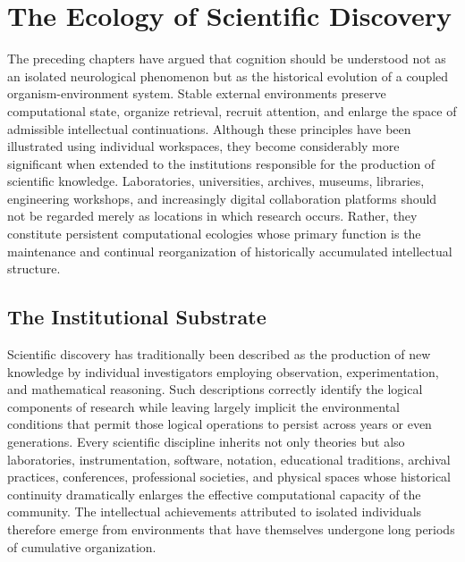 \documentclass[12pt,oneside]{article}
\theoremstyle{remark}
\begin{document}
\section{The Ecology of Scientific Discovery}

The preceding chapters have argued that cognition should be understood not as an isolated neurological phenomenon but as the historical evolution of a coupled organism-environment system. Stable external environments preserve computational state, organize retrieval, recruit attention, and enlarge the space of admissible intellectual continuations. Although these principles have been illustrated using individual workspaces, they become considerably more significant when extended to the institutions responsible for the production of scientific knowledge. Laboratories, universities, archives, museums, libraries, engineering workshops, and increasingly digital collaboration platforms should not be regarded merely as locations in which research occurs. Rather, they constitute persistent computational ecologies whose primary function is the maintenance and continual reorganization of historically accumulated intellectual structure.

\subsection{The Institutional Substrate}

Scientific discovery has traditionally been described as the production of new knowledge by individual investigators employing observation, experimentation, and mathematical reasoning. Such descriptions correctly identify the logical components of research while leaving largely implicit the environmental conditions that permit those logical operations to persist across years or even generations. Every scientific discipline inherits not only theories but also laboratories, instrumentation, software, notation, educational traditions, archival practices, conferences, professional societies, and physical spaces whose historical continuity dramatically enlarges the effective computational capacity of the community. The intellectual achievements attributed to isolated individuals therefore emerge from environments that have themselves undergone long periods of cumulative organization.
\end{document}
